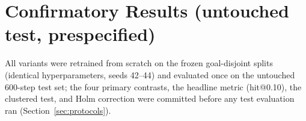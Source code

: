 \section{Confirmatory Results (untouched test, prespecified)}
\label{sec:confirmatory}

All variants were retrained from scratch on the frozen goal-disjoint
splits (identical hyperparameters, seeds 42--44) and evaluated once on the
untouched 600-step test set; the four primary contrasts, the headline
metric (hit@0.10), the clustered test, and Holm correction were committed
before any test evaluation ran (Section~\ref{sec:protocols}).

\begin{table}[tb]
\begin{center}\small
\fittab{}
\end{center}
\caption{\textbf{Confirmatory} main ablation on the untouched,
goal-disjoint AITW test set ($n{=}600$ steps;
$n_{\text{train}}{=}1200$; 3 seeds; mean$\pm$std across seeds).
$\Delta$ vs.\ A: episode-clustered 95\% CI and permutation $p$
(Holm-adjusted across the four primary contrasts where applicable).}
\label{tab:confirmatory}
\end{table}

\newcommand{\tabcontrolfloat}{%
\begin{table}[tb]
\begin{center}\small
\fittab{}
\end{center}
\caption{Confirmatory control mix (\texttt{taps\_and\_swipes}) on its
frozen 400-step test set. The control was designed as the falsifiable half
of the thesis --- conditioning should not help where action type is
uninformative --- and it \emph{fails}: D-hook shows a significant gain here
too (Section~\ref{sec:controlfail}).}
\label{tab:control}
\end{table}}
\ifworkshopbuild\else\tabcontrolfloat\fi

\newcommand{\tablowdatafloat}{%
\begin{table}[tb]
\begin{center}\small
\fittab{}
\end{center}
\caption{Confirmatory low-data grid on the \emph{same} frozen test set for
every training size (nested training prefixes), removing the
per-size-val-set confound of Figure~\ref{fig:scaling}.}
\label{tab:lowdata}
\end{table}}
\ifworkshopbuild\else\tablowdatafloat\fi

